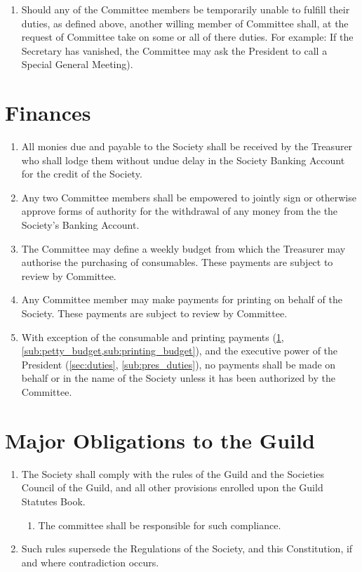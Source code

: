\documentclass[a4paper]{article}
\begin{document}
\begin{enumerate}
    \item Should any of the Committee members be temporarily unable to fulfill their duties, as defined above, another willing member of Committee shall, at the request of Committee take on some or all of there duties. For example: If the Secretary has vanished, the Committee may ask the President to call a Special General Meeting).
\end{enumerate}


\section{Finances} \label{sec:finances}
\begin{enumerate}
	\item All monies due and payable to the Society shall be received by the Treasurer who shall lodge them without undue delay in the Society Banking Account for the credit of the Society.
    \item Any two Committee members shall be empowered to jointly sign or otherwise approve forms of authority for the withdrawal of any money from the the Society's Banking Account.
    \item \label{sub:petty_budget} The Committee may define a weekly budget from which the Treasurer may authorise the purchasing of consumables. These payments are subject to review by Committee.
    \item \label{sub:printing_budget} Any Committee member may make payments for printing on behalf of the Society. These payments are subject to review by Committee.
    \item With exception of the consumable and printing payments (\cref{sec:finances}, \cref{sub:petty_budget,sub:printing_budget}), and the executive power of the President (\cref{sec:duties}, \cref{sub:pres_duties}), no payments shall be made on behalf or in the name of the Society unless it has been authorized by the Committee.
\end{enumerate}

\section{Major Obligations to the Guild} \label{sec:guild_obligations}
\begin{enumerate}
    \item The Society shall comply with the rules of the Guild and the Societies Council of the Guild, and all other provisions enrolled upon the Guild Statutes Book.
    \begin{enumerate}
        \item The committee shall be responsible for such compliance.
    \end{enumerate}
    \item Such rules supersede the Regulations of the Society, and this Constitution, if and where contradiction occurs.
\end{enumerate}
\end{document}
